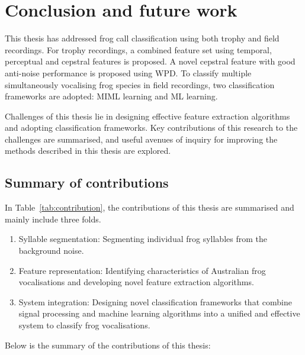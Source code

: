 
\chapter[Conclusion]{Conclusion and future work}
\label{cha:cha8Conclusions}

This thesis has addressed frog call classification using both trophy and field recordings. For trophy recordings, a combined feature set using temporal, perceptual and cepstral features is proposed. A novel cepstral feature with good anti-noise performance is proposed using WPD. 
To classify multiple simultaneously vocalising frog species in field recordings, two classification frameworks are adopted: MIML learning and ML learning. 

Challenges of this thesis lie in designing effective feature extraction algorithms and adopting classification frameworks. Key contributions of this research to the challenges are summarised, and useful avenues of inquiry for improving the methods described in this thesis are explored.

\section{Summary of contributions}
	
In Table~\ref{tab:contribution}, the contributions of this thesis are summarised and mainly include three folds.

\begin{enumerate}
\item Syllable segmentation: Segmenting individual frog syllables from the background noise.

\item Feature representation: Identifying characteristics of Australian frog vocalisations and developing novel feature extraction algorithms.

\item System integration: Designing novel classification frameworks that combine signal processing and machine learning algorithms into a unified and effective system to classify frog vocalisations.

\end{enumerate}

Below is the summary of the contributions of this thesis:

	
